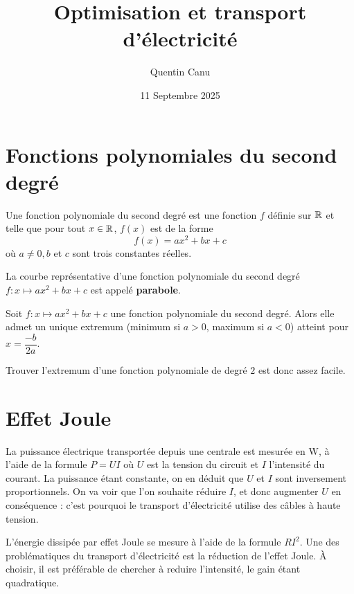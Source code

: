 \documentclass{poly}
\title{Optimisation et transport d'électricité}
\author{Quentin Canu}
\date{11 Septembre 2025}
\begin{document}
\maketitle

\section{Fonctions polynomiales du second degré}
\begin{definition}
Une fonction polynomiale du second degré est une fonction $f$ définie sur $\mathbb{R}$ et telle que pour tout $x \in \mathbb{R}$, $f(x)$ est de la forme
\begin{equation*}
f(x) = ax^2 + bx + c
\end{equation*}
où $a \neq 0, b$ et $c$ sont trois constantes réelles.
\end{definition}
\begin{example}
\dotfill
\end{example}
\begin{definition}
La courbe représentative d'une fonction polynomiale du second degré $f \colon x \mapsto ax^2 + bx + c$ est appelé \textbf{parabole}.
\end{definition}
\begin{proposition}
Soit $f \colon x \mapsto ax^2 + bx + c$ une fonction polynomiale du second degré. Alors elle admet un unique extremum (minimum si $a > 0$, maximum si $a < 0$) atteint pour $x = \dfrac{-b}{2a}$.
\end{proposition}
Trouver l'extremum d'une fonction polynomiale de degré $2$ est donc assez facile.

\section{Effet Joule}
La puissance électrique transportée depuis une centrale est mesurée en \unit{W}, à l'aide de la formule $P = UI$ où $U$ est la tension du circuit et $I$ l'intensité du courant. La puissance étant constante, on en déduit que $U$ et $I$ sont inversement proportionnels. On va voir que l'on souhaite réduire $I$, et donc augmenter $U$ en conséquence : c'est pourquoi le transport d'électricité utilise des câbles à haute tension.

L'énergie dissipée par effet Joule se mesure à l'aide de la formule $RI^2$. Une des problématiques du transport d'électricité est la réduction de l'effet Joule. À choisir, il est préférable de chercher à reduire l'intensité, le gain étant quadratique.
\end{document}
